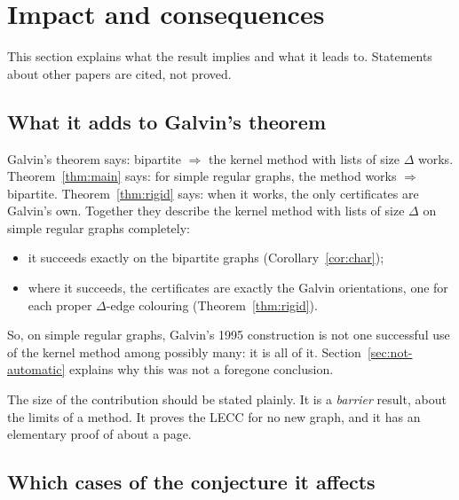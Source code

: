 \documentclass[11pt]{article}
\theoremstyle{plain}
\theoremstyle{definition}
\theoremstyle{remark}
\begin{document}
\section{Impact and consequences}\label{sec:impact}

This section explains what the result implies and what it leads to. Statements about other
papers are cited, not proved.

\subsection{What it adds to Galvin's theorem}

Galvin's theorem says: bipartite $\Rightarrow$ the kernel method with lists of size $\Delta$
works. Theorem~\ref{thm:main} says: for simple regular graphs, the method works $\Rightarrow$
bipartite. Theorem~\ref{thm:rigid} says: when it works, the only certificates are Galvin's own.
Together they describe the kernel method with lists of size $\Delta$ on simple regular graphs
completely:
\begin{itemize}
  \item it succeeds exactly on the bipartite graphs (Corollary~\ref{cor:char});
  \item where it succeeds, the certificates are exactly the Galvin orientations, one for each
    proper $\Delta$-edge colouring (Theorem~\ref{thm:rigid}).
\end{itemize}
So, on simple regular graphs, Galvin's 1995 construction is not one successful use of the
kernel method among possibly many: it is all of it. Section~\ref{sec:not-automatic} explains why
this was not a foregone conclusion.

The size of the contribution should be stated plainly. It is a \emph{barrier} result, about the
limits of a method. It proves the LECC for no new graph, and it has an elementary proof of about
a page.

\subsection{Which cases of the conjecture it affects}
\end{document}
